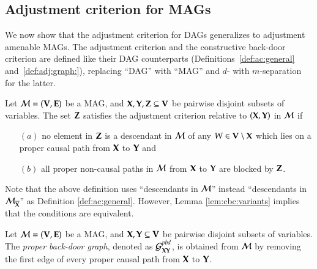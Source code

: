 \subsection{Adjustment criterion for MAGs}

We now show that the adjustment criterion for DAGs 
generalizes to adjustment amenable MAGs. 
The adjustment criterion and the constructive
back-door criterion are defined 
like their DAG counterparts (Definitions~\ref{def:ac:general} 
and~\ref{def:adj:graph:}), replacing “DAG” with “MAG” and $d$- 
with $m$-separation for the latter.

\begin{definition}\label{def:ac:general:mag}
Let ${\cal M} = ({\bf V},{\bf E})$ be a MAG, and ${\bf X},{\bf Y},{\bf Z} \subseteq {\bf V}$ 
be pairwise disjoint subsets of variables. 
The set ${\bf Z}$ satisfies the adjustment criterion relative to $({\bf X}, {\bf Y})$ in ${\cal M}$ if 
\begin{enumerate}
   \item[$(a)$] 
    no element in ${\bf Z}$ is a descendant in ${\cal M}$ %
    of any $W \in {\bf V} \setminus {\bf X}$ 
   which lies on a proper causal path from ${\bf X}$ to ${\bf Y}$
   and 
   \item[$(b)$]
   all proper non-causal paths in ${\cal M}$ from ${\bf X}$ to ${\bf Y}$ are blocked by ${\bf Z}$.
\end{enumerate}
\end{definition}

Note that the above definition uses “descendants in $ {\cal M} $” instead “descendants in $ {\cal M}_{\overline{{\bf X}}} $” as Definition \ref{def:ac:general}. 
However, Lemma \ref{lem:cbc:variants} implies that the conditions are equivalent.



\begin{definition} \label{def:adj:graph:mag}
Let ${\cal M} = ({\bf V},{\bf E})$ be a MAG, and ${\bf X},{\bf Y}\subseteq {\bf V}$ 
be pairwise disjoint subsets of variables. 
The \emph{proper back-door graph}, denoted as  ${\cal G}^{pbd}_{{\bf X}{\bf Y}}$,
is obtained from ${\cal M}$ by removing 
the first edge of every proper causal path from ${\bf X}$ to ${\bf Y}$.
\end{definition}


